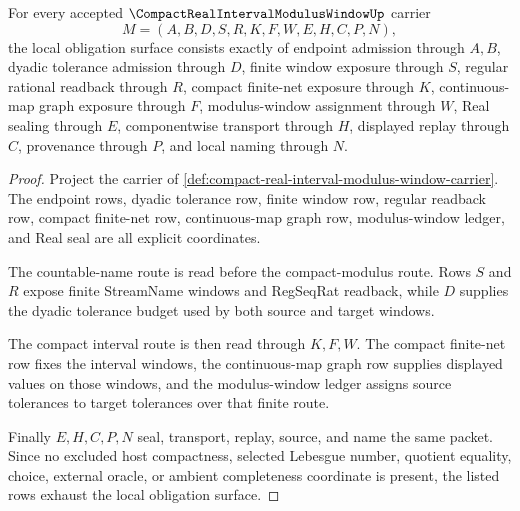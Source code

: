 \begin{theorem}
\label{thm:compact-real-interval-modulus-window-obligation}
For every accepted $\CompactRealIntervalModulusWindowUp$ carrier
$$
M=(A,B,D,S,R,K,F,W,E,H,C,P,N),
$$
the local obligation surface consists exactly of endpoint admission through $A,B$, dyadic tolerance admission through $D$, finite window exposure through $S$, regular rational readback through $R$, compact finite-net exposure through $K$, continuous-map graph exposure through $F$, modulus-window assignment through $W$, Real sealing through $E$, componentwise transport through $H$, displayed replay through $C$, provenance through $P$, and local naming through $N$.
\end{theorem}
\begin{proof}
Project the carrier of \autoref{def:compact-real-interval-modulus-window-carrier}. The endpoint rows, dyadic tolerance row, finite window row, regular readback row, compact finite-net row, continuous-map graph row, modulus-window ledger, and Real seal are all explicit coordinates.

The countable-name route is read before the compact-modulus route. Rows $S$ and $R$ expose finite StreamName windows and RegSeqRat readback, while $D$ supplies the dyadic tolerance budget used by both source and target windows.

The compact interval route is then read through $K,F,W$. The compact finite-net row fixes the interval windows, the continuous-map graph row supplies displayed values on those windows, and the modulus-window ledger assigns source tolerances to target tolerances over that finite route.

Finally $E,H,C,P,N$ seal, transport, replay, source, and name the same packet. Since no excluded host compactness, selected Lebesgue number, quotient equality, choice, external oracle, or ambient completeness coordinate is present, the listed rows exhaust the local obligation surface.
\end{proof}

